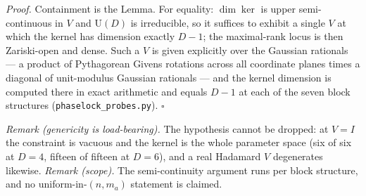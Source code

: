 \documentclass[
]{article}
\begin{document}
\emph{Proof.} Containment is the Lemma. For equality: \(\dim \ker\) is
upper semi-continuous in \(V\) and \(\mathrm{U}(D)\) is irreducible, so
it suffices to exhibit a single \(V\) at which the kernel has dimension
exactly \(D-1\); the maximal-rank locus is then Zariski-open and dense.
Such a \(V\) is given explicitly over the Gaussian rationals --- a
product of Pythagorean Givens rotations across all coordinate planes
times a diagonal of unit-modulus Gaussian rationals --- and the kernel
dimension is computed there in exact arithmetic and equals \(D-1\) at
each of the seven block structures (\texttt{phaselock\_probes.py}).
\(\square\)

\emph{Remark (genericity is load-bearing).} The hypothesis cannot be
dropped: at \(V = I\) the constraint is vacuous and the kernel is the
whole parameter space (six of six at \(D = 4\), fifteen of fifteen at
\(D = 6\)), and a real Hadamard \(V\) degenerates likewise. \emph{Remark
(scope).} The semi-continuity argument runs per block structure, and no
uniform-in-\((n, m_a)\) statement is claimed.
\end{document}
